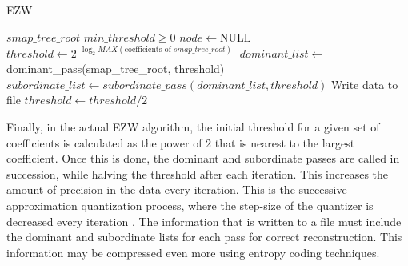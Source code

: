 \documentclass[./A14_Report.tex]{subfiles}
\begin{document}
\begin{algorithm}[H]
    \caption{EZW}
    \label{alg:ezw}
    \begin{algorithmic}
        \Require $smap\_tree\_root$ 
        \Require $min\_threshold \ge 0$
        \State $node \gets \text{NULL}$
        \State $threshold \gets 2^{\lfloor\log_2{MAX(\text{coefficients of } smap\_tree\_root)}\rfloor}$
            \State $dominant\_list \gets$ dominant\_pass(smap\_tree\_root, threshold)
            \State $subordinate\_list \gets subordinate\_pass(dominant\_list, threshold)$
            \State Write data to file
            \State $threshold \gets threshold/2$
        \EndWhile
    \end{algorithmic}
\end{algorithm}

Finally, in the actual EZW algorithm, the initial threshold for a given set of
coefficients is calculated as the power of $2$ that is nearest to the largest
coefficient. Once this is done, the dominant and subordinate passes are called
in succession, while halving the threshold after each iteration. This increases
the amount of precision in the data every iteration. This is the successive
approximation quantization process, where the step-size of the quantizer is
decreased every iteration \cite{shap1993}. The information that is written to a
file must include the dominant and subordinate lists for each pass for correct
reconstruction. This information may be compressed even more using entropy
coding techniques.
\end{document}

